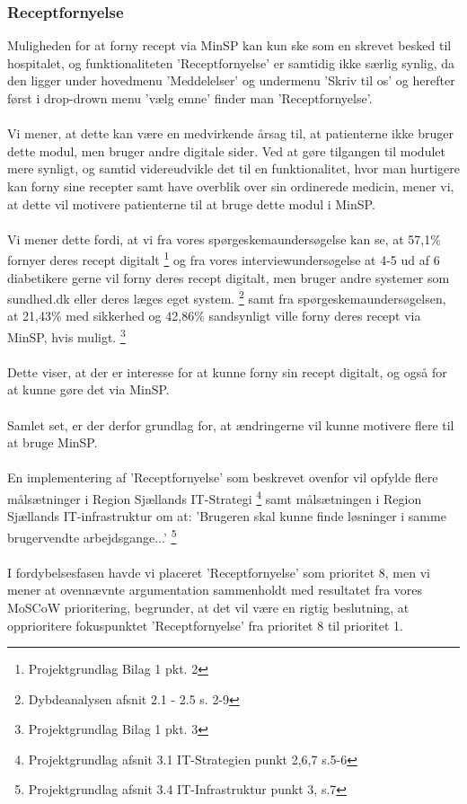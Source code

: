 \subsubsection{Receptfornyelse}
Muligheden for at forny recept via MinSP kan kun ske som en skrevet besked til hospitalet, og funktionaliteten 'Receptfornyelse' er samtidig ikke særlig synlig, da den ligger under hovedmenu 'Meddelelser' og undermenu 'Skriv til os' og herefter først i drop-drown menu 'vælg emne' finder man 'Receptfornyelse'.\\
\\
Vi mener, at dette kan være en medvirkende årsag til, at patienterne ikke bruger dette modul, men bruger andre digitale sider. Ved at gøre tilgangen til modulet mere synligt, og samtid videreudvikle det til en funktionalitet, hvor man hurtigere kan forny sine recepter samt have overblik over sin ordinerede medicin, mener vi, at dette vil motivere patienterne til at bruge dette modul i MinSP.\\
\\
Vi mener dette fordi, at vi fra vores spørgeskemaundersøgelse kan se, at 57,1\% fornyer deres recept digitalt \footnote{Projektgrundlag Bilag 1 pkt. 2} og fra vores interviewundersøgelse at 4-5 ud af 6 diabetikere gerne vil forny deres recept digitalt, men bruger andre systemer som sundhed.dk eller deres læges eget system. \footnote{Dybdeanalysen afsnit 2.1 - 2.5 s. 2-9} samt fra spørgeskemaundersøgelsen, at 21,43\% med sikkerhed og 42,86\% sandsynligt ville forny deres recept via MinSP, hvis muligt. \footnote{Projektgrundlag Bilag 1 pkt. 3} \\
\\
Dette viser, at der er interesse for at kunne forny sin recept digitalt, og også for at kunne gøre det via MinSP.\\
\\
Samlet set, er der derfor grundlag for, at ændringerne vil kunne motivere flere til at bruge MinSP.\\
\\
En implementering af 'Receptfornyelse' som beskrevet ovenfor vil opfylde flere målsætninger i Region Sjællands IT-Strategi \footnote{Projektgrundlag afsnit 3.1 IT-Strategien punkt 2,6,7 s.5-6} samt målsætningen i Region Sjællands IT-infrastruktur om at: 'Brugeren skal kunne finde løsninger i samme brugervendte arbejdsgange...' \footnote{Projektgrundlag afsnit 3.4 IT-Infrastruktur punkt 3, s.7}\\
\\
I fordybelsesfasen havde vi placeret 'Receptfornyelse' som prioritet 8, men vi mener at ovennævnte argumentation sammenholdt med resultatet fra vores MoSCoW prioritering, begrunder, at det vil være en rigtig beslutning, at opprioritere fokuspunktet 'Receptfornyelse' fra prioritet 8 til prioritet 1.
